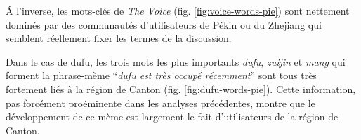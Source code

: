 \'A l{\textquoteright}inverse, les mots-clés de \textit{The Voice} (fig. \ref{fig:voice-words-pie}) sont nettement dominés par des communautés d{\textquoteright}utilisateurs de Pékin ou du Zhejiang qui semblent réellement fixer les termes de la discussion.

\newpage
Dans le cas de dufu, les trois mots les plus importants \textit{dufu}, \textit{zuijin} et \textit{mang} qui forment la phrase-mème ``\textit{dufu est très occupé récemment}'' sont tous très fortement liés \`a la région de Canton (fig. \ref{fig:dufu-words-pie}). Cette information, pas forcément proéminente dans les analyses précédentes, montre que le développement de ce mème est largement le fait d{\textquoteright}utilisateurs de la région de Canton.

\begin{figure}[htbp]
    \centering
\end{figure}
